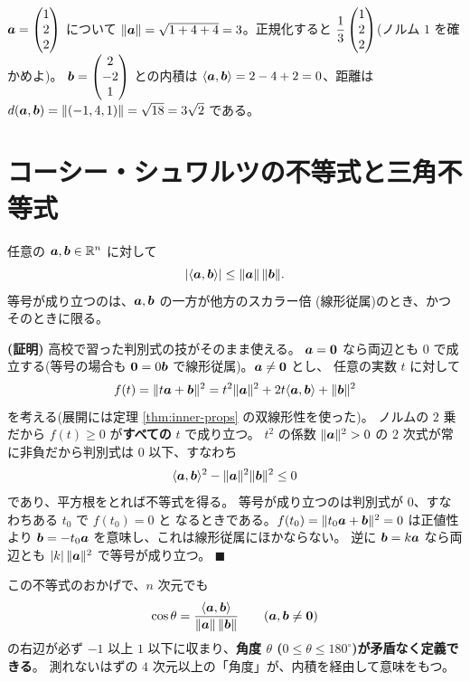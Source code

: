 \begin{rei}[計算例]\label{rei:inner-firstcalc}
$\bm{a} = \begin{pmatrix}1 \\ 2 \\ 2\end{pmatrix}$ について
$\|\bm{a}\| = \sqrt{1 + 4 + 4} = 3$。正規化すると
$\dfrac{1}{3}\begin{pmatrix}1 \\ 2 \\ 2\end{pmatrix}$(ノルム $1$ を確かめよ)。
$\bm{b} = \begin{pmatrix}2 \\ -2 \\ 1\end{pmatrix}$ との内積は
$\langle \bm{a}, \bm{b} \rangle = 2 - 4 + 2 = 0$、距離は
$d(\bm{a}, \bm{b}) = \|(-1, 4, 1)\| = \sqrt{18} = 3\sqrt{2}$ である。
\end{rei}

\section{コーシー・シュワルツの不等式と三角不等式}

\begin{teiri}\label{thm:inner-cs}
任意の $\bm{a}, \bm{b} \in \mathbb{R}^n$ に対して
\[
|\langle \bm{a}, \bm{b} \rangle| \le \|\bm{a}\|\,\|\bm{b}\|.
\]
等号が成り立つのは、$\bm{a}, \bm{b}$ の一方が他方のスカラー倍
(線形従属)のとき、かつそのときに限る。
\end{teiri}

\noindent\textbf{(証明)}\quad
高校で習った判別式の技がそのまま使える。
$\bm{a} = \bm{0}$ なら両辺とも $0$ で成立する(等号の場合も
$\bm{0} = 0\bm{b}$ で線形従属)。$\bm{a} \neq \bm{0}$ とし、
任意の実数 $t$ に対して
\[
f(t) = \| t\bm{a} + \bm{b} \|^2
= t^2 \|\bm{a}\|^2 + 2t\langle \bm{a}, \bm{b} \rangle + \|\bm{b}\|^2
\]
を考える(展開には定理 \ref{thm:inner-props} の双線形性を使った)。
ノルムの $2$ 乗だから $f(t) \ge 0$ が\textbf{すべての} $t$ で成り立つ。
$t^2$ の係数 $\|\bm{a}\|^2 > 0$ の $2$ 次式が常に非負だから判別式は
$0$ 以下、すなわち
\[
\langle \bm{a}, \bm{b} \rangle^2 - \|\bm{a}\|^2 \|\bm{b}\|^2 \le 0
\]
であり、平方根をとれば不等式を得る。
等号が成り立つのは判別式が $0$、すなわちある $t_0$ で $f(t_0) = 0$ と
なるときである。$f(t_0) = \|t_0\bm{a} + \bm{b}\|^2 = 0$ は正値性より
$\bm{b} = -t_0\bm{a}$ を意味し、これは線形従属にほかならない。
逆に $\bm{b} = k\bm{a}$ なら両辺とも $|k|\,\|\bm{a}\|^2$ で等号が成り立つ。
$\blacksquare$

この不等式のおかげで、$n$ 次元でも
\[
\cos\theta = \frac{\langle \bm{a}, \bm{b} \rangle}{\|\bm{a}\|\,\|\bm{b}\|}
\qquad (\bm{a}, \bm{b} \neq \bm{0})
\]
の右辺が必ず $-1$ 以上 $1$ 以下に収まり、\textbf{角度 $\theta$
($0 \le \theta \le 180^\circ$)が矛盾なく定義できる}。
測れないはずの $4$ 次元以上の「角度」が、内積を経由して意味をもつ。

